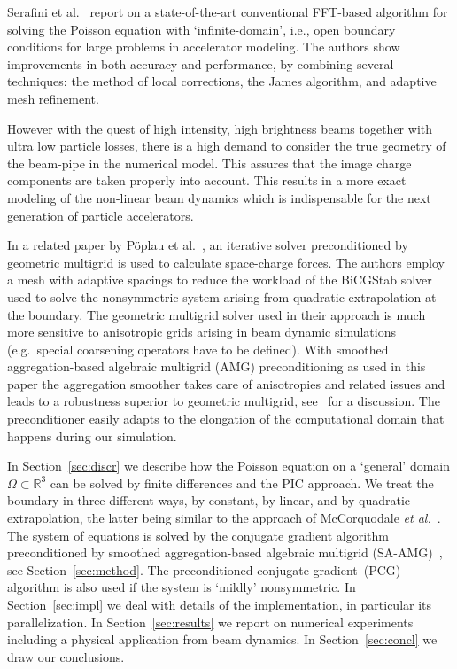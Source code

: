 \documentclass[a4paper,10pt,3p,final,pdftex]{elsarticle}
\renewcommand{\Re}{\mathbb{R}}
\begin{document}
Serafini et al.~\cite{serafini_2005} report on a state-of-the-art
conventional FFT-based algorithm for solving the Poisson equation with
`infinite-domain', i.e., open boundary conditions for large problems in
accelerator modeling.  The authors show improvements in both accuracy
and performance, by combining several techniques: the method of local
corrections, the James algorithm, and adaptive mesh refinement.

However with the quest of high intensity, high brightness beams together
with ultra low particle losses, there is a high demand to consider the
true geometry of the beam-pipe in the numerical model. This assures that
the image charge components are taken properly into account. This
results in a more exact modeling of the non-linear beam dynamics which
is indispensable for the next generation of particle accelerators.

In a related paper by P{\"o}plau et
al.~\cite{poplau_self-adaptive_2008}, an iterative solver preconditioned
by geometric multigrid is used to calculate space-charge forces.  The
authors employ a mesh with adaptive spacings to reduce the workload of
the BiCGStab solver used to solve the nonsymmetric system arising from
quadratic extrapolation at the boundary.  The geometric multigrid solver
used in their approach is much more sensitive to anisotropic grids
arising in beam dynamic simulations (e.g.\ special coarsening operators
have to be defined).  With smoothed aggregation-based algebraic multigrid
(AMG) preconditioning as used in this paper the aggregation smoother takes
care of anisotropies and related issues and leads to a robustness superior
to geometric multigrid, see~\cite{trcl:09} for a discussion.  The
preconditioner easily adapts to the elongation  of the computational domain
that happens during our simulation.

In Section~\ref{sec:discr} we describe how the Poisson equation on a
`general' domain $\Omega \subset \Re^3$ can be solved by finite
differences and the PIC approach.  We treat the boundary in three
different ways, by constant, by linear, and by quadratic extrapolation,
the latter being similar to the approach of McCorquodale \textit{et
  al.}~\cite{mcgv:04}.  The system of equations is solved by the
conjugate gradient algorithm preconditioned by smoothed 
aggregation-based algebraic multigrid (SA-AMG)~\cite{vamb:96a, tuto:00},
see Section~\ref{sec:method}. The preconditioned conjugate
gradient~(PCG) algorithm is also used if the system is `mildly'
nonsymmetric.  In Section~\ref{sec:impl} we deal with details of the
implementation, in particular its parallelization.  In
Section~\ref{sec:results} we report on numerical experiments including a
physical application from beam dynamics.  In Section~\ref{sec:concl} we
draw our conclusions.
\end{document}
